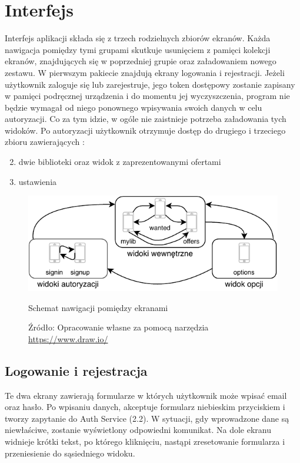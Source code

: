 \chapter{Interfejs}
\label{cha:interfejs}

Interfejs aplikacji składa się z trzech rodzielnych zbiorów ekranów. Każda nawigacja pomiędzy tymi grupami skutkuje usunięciem z pamięci kolekcji ekranów, znajdujących się w poprzedniej grupie oraz załadowaniem nowego zestawu.
W pierwszym pakiecie znajdują ekrany logowania i rejestracji. Jeżeli użytkownik zaloguje się lub zarejestruje, jego token dostępowy zostanie zapisany w pamięci podręcznej urządzenia i do momentu jej wyczyszczenia, program nie będzie wymagał od niego ponownego wpisywania swoich danych w celu autoryzacji. Co za tym idzie, w ogóle nie zaistnieje potrzeba załadowania tych widoków.
Po autoryzacji użytkownik otrzymuje dostęp do drugiego i trzeciego zbioru zawierających :
\begin{enumerate}
    \setcounter{enumi}{1}
    \item dwie biblioteki oraz widok z zaprezentowanymi ofertami
    \item ustawienia
\end{enumerate} 

\begin{figure}[H]
	\centering
	\includegraphics[width=\linewidth]{navig.pdf}
	\caption{\centering Schemat nawigacji pomiędzy ekranami}
	\caption*{\centering Źródło: {Opracowanie własne za pomocą narzędzia \url{https://www.draw.io/}}}
\end{figure}

\section{Logowanie i rejestracja}
Te dwa ekrany zawierają formularze w których użytkownik może wpisać email oraz hasło. Po wpisaniu danych, akceptuje formularz niebieskim przyciskiem i tworzy zapytanie do Auth Service (2.2). W sytuacji, gdy wprowadzone dane są niewłaściwe, zostanie wyświetlony odpowiedni komunikat.
Na dole ekranu widnieje krótki tekst, po którego kliknięciu, nastąpi zresetowanie formularza i przeniesienie do sąsiedniego widoku.

